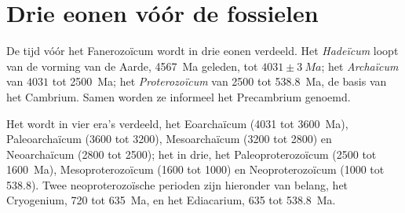 \section{Drie eonen vóór de fossielen}\label{sec:b2:precambrian-earth:eons}

\begin{definition}\label{def:b2:precambrian-earth:eons}
De tijd vóór het Fanerozoïcum wordt in drie eonen verdeeld. Het \emph{Hadeïcum}
loopt van de vorming van de Aarde, \qty{4567}{Ma} geleden, tot $4031 \pm \qty{3}{Ma}$; het
\emph{Archaïcum} van $4031$ tot \qty{2500}{Ma}; het
\emph{Proterozoïcum} van 2500 tot \qty{538.8}{Ma}, de basis van het Cambrium.
Samen worden ze informeel het Precambrium genoemd.
\end{definition}

Het  wordt in vier era's verdeeld, het Eoarchaïcum (4031 tot \qty{3600}{Ma}), Paleoarchaïcum (3600
tot 3200), Mesoarchaïcum (3200 tot 2800) en Neoarchaïcum (2800 tot 2500); het  in drie,
het Paleoproterozoïcum (2500 tot \qty{1600}{Ma}), Mesoproterozoïcum (1600 tot 1000) en
Neoproterozoïcum (1000 tot 538.8). Twee neoproterozoïsche perioden zijn hieronder van belang, het Cryogenium, 720 tot
\qty{635}{Ma}, en het Ediacarium, 635 tot \qty{538.8}{Ma}.

